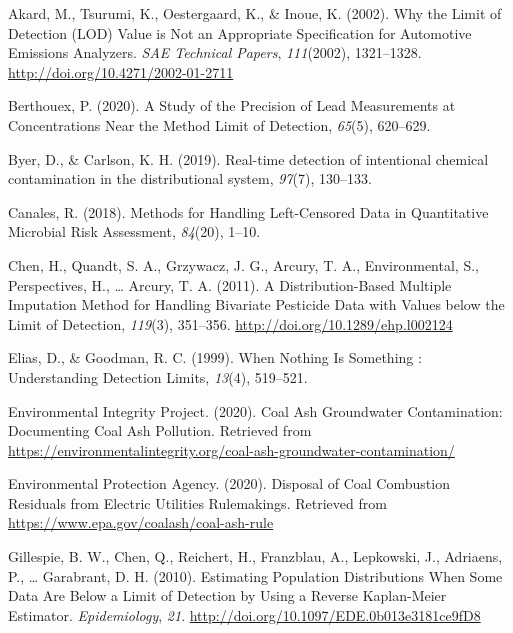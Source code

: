 \documentclass[12pt, twoside]{amherstthesis}
\newlength{\cslhangindent}
\newenvironment{cslreferences}%
  {\setlength{\parindent}{0pt}%
  \everypar{\setlength{\hangindent}{\cslhangindent}}\ignorespaces}%
  {\par}
\begin{document}
\hypertarget{refs}{}
\begin{cslreferences}
\leavevmode\hypertarget{ref-Akard2002}{}%
Akard, M., Tsurumi, K., Oestergaard, K., \& Inoue, K. (2002). Why the Limit of Detection (LOD) Value is Not an Appropriate Specification for Automotive Emissions Analyzers. \emph{SAE Technical Papers}, \emph{111}(2002), 1321--1328. \url{http://doi.org/10.4271/2002-01-2711}

\leavevmode\hypertarget{ref-Berthouex2020}{}%
Berthouex, P. (2020). A Study of the Precision of Lead Measurements at Concentrations Near the Method Limit of Detection, \emph{65}(5), 620--629.

\leavevmode\hypertarget{ref-Byer2019}{}%
Byer, D., \& Carlson, K. H. (2019). Real-time detection of intentional chemical contamination in the distributional system, \emph{97}(7), 130--133.

\leavevmode\hypertarget{ref-Canales2018}{}%
Canales, R. (2018). Methods for Handling Left-Censored Data in Quantitative Microbial Risk Assessment, \emph{84}(20), 1--10.

\leavevmode\hypertarget{ref-Chen2011}{}%
Chen, H., Quandt, S. A., Grzywacz, J. G., Arcury, T. A., Environmental, S., Perspectives, H., \ldots{} Arcury, T. A. (2011). A Distribution-Based Multiple Imputation Method for Handling Bivariate Pesticide Data with Values below the Limit of Detection, \emph{119}(3), 351--356. \url{http://doi.org/10.1289/ehp.l002124}

\leavevmode\hypertarget{ref-Elias1999}{}%
Elias, D., \& Goodman, R. C. (1999). When Nothing Is Something : Understanding Detection Limits, \emph{13}(4), 519--521.

\leavevmode\hypertarget{ref-EIP2020}{}%
Environmental Integrity Project. (2020). Coal Ash Groundwater Contamination: Documenting Coal Ash Pollution. Retrieved from \url{https://environmentalintegrity.org/coal-ash-groundwater-contamination/}

\leavevmode\hypertarget{ref-Car2020}{}%
Environmental Protection Agency. (2020). Disposal of Coal Combustion Residuals from Electric Utilities Rulemakings. Retrieved from \url{https://www.epa.gov/coalash/coal-ash-rule}

\leavevmode\hypertarget{ref-Gillespie2010}{}%
Gillespie, B. W., Chen, Q., Reichert, H., Franzblau, A., Lepkowski, J., Adriaens, P., \ldots{} Garabrant, D. H. (2010). Estimating Population Distributions When Some Data Are Below a Limit of Detection by Using a Reverse Kaplan-Meier Estimator. \emph{Epidemiology}, \emph{21}. \url{http://doi.org/10.1097/EDE.0b013e3181ce9fD8}


\end{cslreferences}
\end{document}
